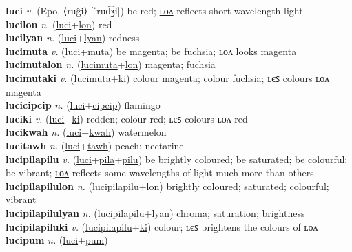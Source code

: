 \textbf{luci} \textit{v.} (Epo. ⟨ruĝi⟩ [ˈrud͡ʒi])
be red; \hyperref[lucilon]{ʟᴏᴧ} reflects short wavelength light \label{luci} \\
\textbf{lucilon} \textit{n.} (\hyperref[luci]{luci}+\hyperref[lon]{lon})
red \label{lucilon} \\
\textbf{lucilyan} \textit{n.} (\hyperref[luci]{luci}+\hyperref[lyan]{lyan})
redness \label{lucilyan} \\
\textbf{lucimuta} \textit{v.} (\hyperref[luci]{luci}+\hyperref[muta]{muta})
be magenta; be fuchsia; \hyperref[lucimutalon]{ʟᴏᴧ} looks magenta \label{lucimuta} \\
\textbf{lucimutalon} \textit{n.} (\hyperref[lucimuta]{lucimuta}+\hyperref[lon]{lon})
magenta; fuchsia \label{lucimutalon} \\
\textbf{lucimutaki} \textit{v.} (\hyperref[lucimuta]{lucimuta}+\hyperref[ki]{ki})
colour magenta; colour fuchsia; ʟєꜱ colours ʟᴏᴧ magenta \label{lucimutaki} \\
\textbf{lucicipcip} \textit{n.} (\hyperref[luci]{luci}+\hyperref[cipcip]{cipcip})
flamingo \label{lucicipcip} \\
\textbf{luciki} \textit{v.} (\hyperref[luci]{luci}+\hyperref[ki]{ki})
redden; colour red; ʟєꜱ colours ʟᴏᴧ red \label{luciki} \\
\textbf{lucikwah} \textit{n.} (\hyperref[luci]{luci}+\hyperref[kwah]{kwah})
watermelon \label{lucikwah} \\
\textbf{lucitawh} \textit{n.} (\hyperref[luci]{luci}+\hyperref[tawh]{tawh})
peach; nectarine \label{lucitawh} \\
\textbf{lucipilapilu} \textit{v.} (\hyperref[luci]{luci}+\hyperref[pila]{pila}+\hyperref[pilu]{pilu})
be brightly coloured; be saturated; be colourful; be vibrant; \hyperref[lucipilapilulon]{ʟᴏᴧ} reflects some wavelengths of light much more than others \label{lucipilapilu} \\
\textbf{lucipilapilulon} \textit{n.} (\hyperref[lucipilapilu]{lucipilapilu}+\hyperref[lon]{lon})
brightly coloured; saturated; colourful; vibrant \label{lucipilapilulon} \\
\textbf{lucipilapilulyan} \textit{n.} (\hyperref[lucipilapilu]{lucipilapilu}+\hyperref[lyan]{lyan})
chroma; saturation; brightness \label{lucipilapilulyan} \\
\textbf{lucipilapiluki} \textit{v.} (\hyperref[lucipilapilu]{lucipilapilu}+\hyperref[ki]{ki})
colour; ʟєꜱ brightens the colours of ʟᴏᴧ \label{lucipilapiluki} \\
\textbf{lucipum} \textit{n.} (\hyperref[luci]{luci}+\hyperref[pum]{pum})
